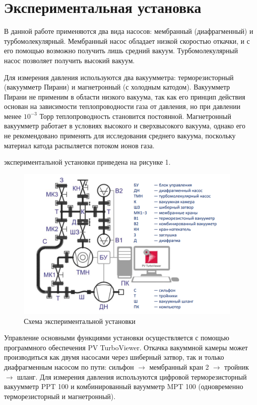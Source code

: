 \documentclass[15pt,a5paper,reqno]{article}
\begin{document}
\section{Экспериментальная установка}

    В данной работе применяются два вида насосов: мембранный (диафрагменный) и турбомолекулярный. Мембранный насос обладает низкой скоростью откачки, и с его помощью возможно получить лишь средний вакуум. Турбомолекулярный насос позволяет получить высокий вакуум.
     
    Для измерения давления используются два вакуумметра: терморезисторный (вакуумметр Пирани) и магнетронный (с холодным катодом). Вакуумметр Пирани не применим в области низкого вакуума, так как его принцип действия основан на зависимости теплопроводности газа от давления, но при давлении менее $10^{-3}$ Торр теплопроводность становится постоянной. Магнетронный вакуумметр работает в условиях высокого и сверхвысокого вакуума, однако его не рекомендовано применять для исследования среднего вакуума, поскольку материал катода распыляется потоком ионов газа.
    
     экспериментальной установки приведена на рисунке 1.
    \begin{figure}[h]
		\centering
		\includegraphics[width=11cm]{Установка.PNG}
		\caption{Схема экспериментальной установки}
		\label{stand}
	\end{figure}
	
	Управление основными функциями установки осуществляется с помощью программного обеспечения PV TurboViewer. Откачка вакуммной камеры может производиться как двумя насосами через шиберный затвор, так и только диафрагменным насосом по пути: сильфон $\rightarrow$ мембранный кран 2 $\rightarrow$ тройник $\rightarrow$ шланг. Для измерения давления используются цифровой терморезисторный вакуумметр PPT 100 и комбинированный вауумметр MPT 100 (одновременно терморезисторный и магнетронный). 
	
\end{document}
